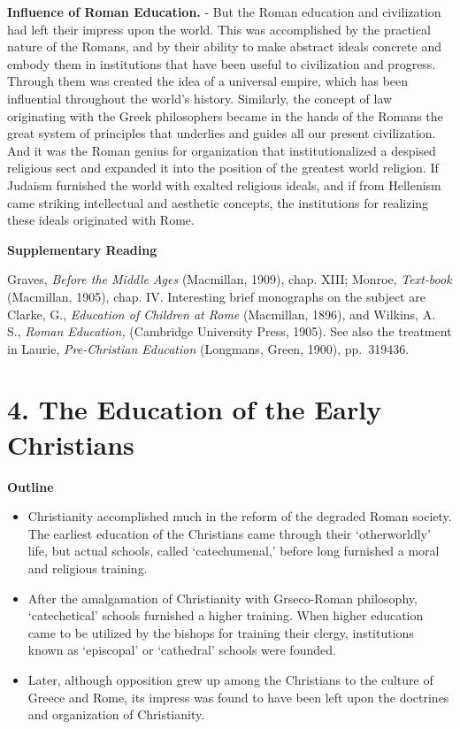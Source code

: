 \documentclass[]{book}
\providecommand{\tightlist}{%
  \setlength{\itemsep}{0pt}\setlength{\parskip}{0pt}}
\begin{document}
\textbf{Influence of Roman Education.} - But the Roman education and civilization had left their impress upon the world. This was accomplished by the practical nature of the Romans, and by their ability to make abstract ideals concrete and embody them in institutions that have been useful to civilization and progress. Through them was created the idea of a universal empire, which has been influential throughout the world's history. Similarly, the concept of law originating with the Greek philosophers became in the hands of the Romans the great system of principles that underlies and guides all our present civilization. And it was the Roman genius for organization that institutionalized a despised religious sect and expanded it into the position of the greatest world religion. If Judaism furnished the world with exalted religious ideals, and if from Hellenism came striking intellectual and aesthetic concepts, the institutions for realizing these ideals originated with Rome.

\textbf{Supplementary Reading}

Graves, \emph{Before the Middle Ages} (Macmillan, 1909), chap. XIII; Monroe, \emph{Text-book} (Macmillan, 1905), chap. IV. Interesting brief monographs on the subject are Clarke, G., \emph{Education of Children at Rome} (Macmillan, 1896), and Wilkins, A. S., \emph{Roman Education,} (Cambridge University Press, 1905). See also the treatment in Laurie, \emph{Pre-Christian Education} (Longmans, Green, 1900), pp.~319436.

\hypertarget{the-education-of-the-early-christians}{%
\chapter{4. The Education of the Early Christians}\label{the-education-of-the-early-christians}}

\textbf{Outline}

\begin{itemize}
\tightlist
\item
  Christianity accomplished much in the reform of the degraded Roman society. The earliest education of the Christians came through their `otherworldly' life, but actual schools, called `catechumenal,' before long furnished a moral and religious training.
\item
  After the amalgamation of Christianity with Grseco-Roman philosophy, `catechetical' schools furnished a higher training. When higher education came to be utilized by the bishops for training their clergy, institutions known as `episcopal' or `cathedral' schools were founded.
\item
  Later, although opposition grew up among the Christians to the culture of Greece and Rome, its impress was found to have been left upon the doctrines and organization of Christianity.
\end{itemize}
\end{document}
